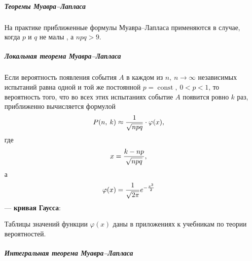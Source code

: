 \documentclass[a4paper]{article}
\DeclareMathOperator{\const}{const}
\newcommand{\sqrtt}[1]{\sqrt{\vphantom{qb} #1}}
\newcommand{\key}[1]{{\bfseries\color{Medium} #1}}
\begin{document}
                    \subparagraph{Теоремы Муавра--Лапласа}

                        На практике приближенные формулы Муавра--Лапласа применяются в случае, когда $p$ и $q$ не малы , а $n p q > 9$.

                    \subparagraph{Локальная теорема Муавра--Лапласа}

                        Если вероятность появления события $A$ в каждом из $n, \: n \to \infty$ независимых испытаний равна одной и той же постоянной $p = \const , \: 0 < p < 1$, то вероятность того, что во всех этих испытаниях событие $A$ появится ровно $k$ раз, приближенно вычисляется формулой
                        \begin{equation*}
                            P(n, \: k) \approx \frac{1}{\sqrtt{n p q}} \cdot \varphi (x) ,
                        \end{equation*}
                        где
                        \begin{equation*}
                            x = \frac{k - n p}{\sqrtt{n p q}} ,
                        \end{equation*}
                        а
                        \begin{equation*}
                            \varphi (x) = \frac{1}{\sqrtt{2 \pi}} e^{-\frac{x^2}{2}}
                        \end{equation*}
                        --- \key{кривая Гаусса}:

                        \vspace{2.0ex}


                        Таблицы значений функции $\varphi (x)$ даны в приложениях к учебникам по теории вероятностей.

                    \subparagraph{Интегральная теорема Муавра--Лапласа}
\end{document}
